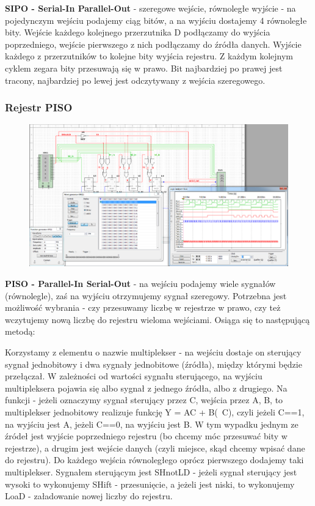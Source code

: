 \documentclass[12pt,a4paper]{article}
\begin{document}
\textbf{SIPO - Serial-In Parallel-Out} - szeregowe wejście, równoległe wyjście - na pojedynczym wejściu podajemy ciąg bitów, a na wyjściu dostajemy 4 równoległe bity. Wejście każdego kolejnego przerzutnika D podłączamy do wyjścia poprzedniego, wejście pierwszego z nich podłączamy do źródła danych. Wyjście każdego z przerzutników to kolejne bity wyjścia rejestru. Z każdym kolejnym cyklem zegara bity przesuwają się w prawo.
Bit najbardziej po prawej jest tracony, najbardziej po lewej jest odczytywany z wejścia szeregowego.

\subsubsection{Rejestr PISO}
\begin{figure}[H]
\centering
\includegraphics[width=\textwidth]{img/3hPISO}
\end{figure}

\textbf{PISO - Parallel-In Serial-Out} - na wejściu podajemy wiele sygnałów (równolegle), zaś na wyjściu otrzymujemy sygnał szeregowy. Potrzebna jest  możliwość wybrania - czy przesuwamy liczbę w rejestrze w prawo, czy też wczytujemy nową liczbę do rejestru wieloma wejściami. Osiąga się to następującą metodą:


Korzystamy z elementu o nazwie multiplekser - na wejściu dostaje on sterujący sygnał jednobitowy i dwa sygnały jednobitowe (źródła), między którymi będzie przełączał. W zależności od wartości sygnału sterującego, na wyjściu multipleksera pojawia się albo sygnał z jednego źródła, albo z drugiego. Na funkcji - jeżeli oznaczymy sygnał sterujący przez C, wejścia przez A, B, to multiplekser jednobitowy realizuje funkcję Y = AC + B(~C), czyli jeżeli C==1, na wyjściu jest A, jeżeli C==0, na wyjściu jest B.
W tym wypadku jednym ze źródeł jest wyjście poprzedniego rejestru (bo chcemy móc przesuwać bity w rejestrze), a drugim jest wejście danych (czyli miejsce, skąd chcemy wpisać dane do rejestru). 
Do każdego wejścia równoległego oprócz pierwszego dodajemy taki multiplekser. Sygnałem sterującym jest SHnotLD - jeżeli sygnał sterujący jest wysoki to wykonujemy SHift - przesunięcie, a jeżeli jest niski, to wykonujemy LoaD - załadowanie nowej liczby do rejestru.
\end{document}
